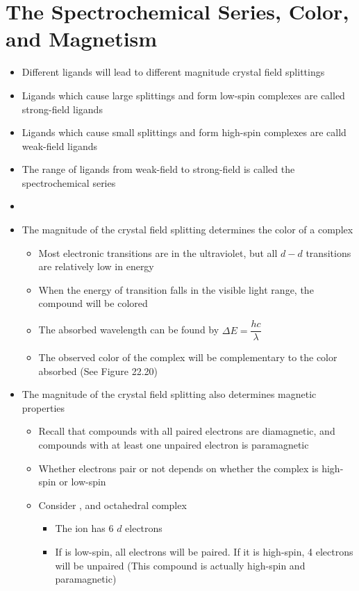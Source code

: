 \documentclass[12pt, openany, letterpaper]{memoir}
\begin{document}
\section{The Spectrochemical Series, Color, and Magnetism}
\begin{itemize}
	\item Different ligands will lead to different magnitude crystal field splittings
	\item Ligands which cause large splittings and form low-spin complexes are called strong-field ligands
	\item Ligands which cause small splittings and form high-spin complexes are calld weak-field ligands
	\item The range of ligands from weak-field to strong-field is called the spectrochemical series
	\item {}
	\item The magnitude of the crystal field splitting determines the color of a complex
	\begin{itemize}
		\item Most electronic transitions are in the ultraviolet, but all $d-d$ transitions are relatively low in energy
		\item When the energy of transition falls in the visible light range, the compound will be colored
		\item The absorbed wavelength can be found by $\Delta E = \dfrac{hc}{\lambda}$
		\item The observed color of the complex will be complementary to the color absorbed (See Figure 22.20)
	\end{itemize}
	\item The magnitude of the crystal field splitting also determines magnetic properties
	\begin{itemize}
		\item Recall that compounds with all paired electrons are diamagnetic, and compounds with at least one unpaired electron is paramagnetic
		\item Whether electrons pair or not depends on whether the complex is high-spin or low-spin
		\item Consider , and octahedral complex
		\begin{itemize}
			\item The  ion has 6 $d$ electrons
			\item If  is low-spin, all electrons will be paired. If it is high-spin, 4 electrons will be unpaired (This compound is actually high-spin and paramagnetic)
		\end{itemize}
	\end{itemize}
\end{itemize}
\end{document}
